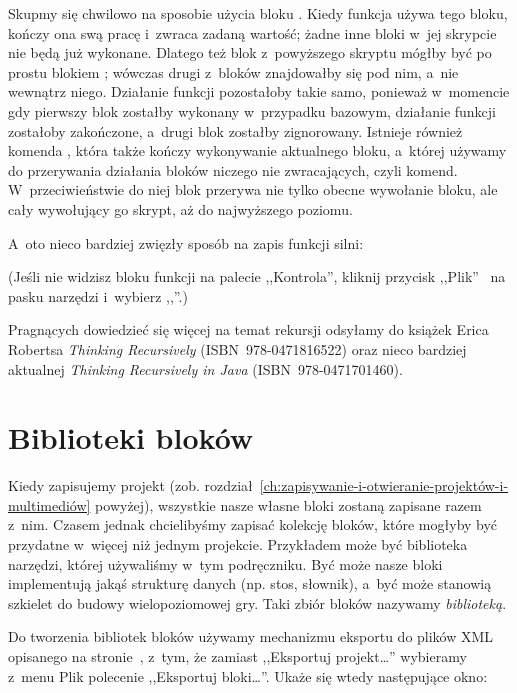 \documentclass[a4paper]{report}
\begin{document}
Skupmy się chwilowo na sposobie użycia bloku . Kiedy funkcja używa tego bloku, kończy ona swą pracę i~zwraca zadaną wartość; żadne inne bloki w~jej skrypcie nie będą już wykonane. Dlatego też blok  z~powyższego skryptu mógłby być po prostu blokiem ; wówczas drugi z~bloków  znajdowałby się pod nim, a~nie wewnątrz niego. Działanie funkcji pozostałoby takie samo, ponieważ w~momencie gdy pierwszy blok  zostałby wykonany w~przypadku bazowym, działanie funkcji zostałoby zakończone, a~drugi blok  zostałby zignorowany. Istnieje również komenda , która także kończy wykonywanie aktualnego bloku, a~której używamy do przerywania działania bloków niczego nie zwracających, czyli komend. W~przeciwieństwie do niej blok  przerywa nie tylko obecne wywołanie bloku, ale cały wywołujący go skrypt, aż do najwyższego poziomu.

A~oto nieco bardziej zwięzły sposób na zapis funkcji silni:\nopagebreak


(Jeśli nie widzisz bloku funkcji  na palecie ,,Kontrola'', kliknij przycisk ,,Plik''~ na pasku narzędzi i~wybierz ,,''.)

Pragnących dowiedzieć się więcej na temat rekursji odsyłamy do książek Erica Robertsa \textit{Thinking Recursively} (ISBN~978-0471816522) oraz nieco bardziej aktualnej \textit{Thinking Recursively in Java} (ISBN~978-0471701460).

\section{Biblioteki bloków}

Kiedy zapisujemy projekt (zob. rozdział~\ref{ch:zapisywanie-i-otwieranie-projektów-i-multimediów} powyżej), wszystkie nasze własne bloki zostaną zapisane razem z~nim. Czasem jednak chcielibyśmy zapisać kolekcję bloków, które mogłyby być przydatne w~więcej niż jednym projekcie. Przykładem może być biblioteka narzędzi, której używaliśmy w~tym podręczniku. Być może nasze bloki implementują jakąś strukturę danych (np. stos, słownik), a~być może stanowią szkielet do budowy wielopoziomowej gry. Taki zbiór bloków nazywamy \emph{biblioteką}.

Do tworzenia bibliotek bloków używamy mechanizmu eksportu do plików XML opisanego na stronie~\pageref{subsec:eksport-do-pliku-xml}, z~tym, że zamiast ,,Eksportuj projekt\ldots'' wybieramy z~menu Plik polecenie ,,Eksportuj bloki\ldots''. Ukaże się wtedy następujące okno:\nopagebreak
\end{document}
